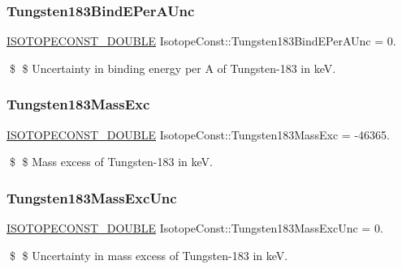 \subsubsection{\texorpdfstring{Tungsten183\+Bind\+E\+Per\+A\+Unc}{Tungsten183BindEPerAUnc}}
{\footnotesize\ttfamily \mbox{\hyperlink{group___isotope_const-_macros_ga8f45a7272ce02c0b4c65c44636ed719a}{I\+S\+O\+T\+O\+P\+E\+C\+O\+N\+S\+T\+\_\+\+D\+O\+U\+B\+LE}} Isotope\+Const\+::\+Tungsten183\+Bind\+E\+Per\+A\+Unc = 0.}

\$ \$ Uncertainty in binding energy per A of Tungsten-\/183 in keV. \mbox{\label{group___isotope_const-_tungsten-_w183_gacbff8d9805cc71177333bfcd1dae6556}} 
\subsubsection{\texorpdfstring{Tungsten183\+Mass\+Exc}{Tungsten183MassExc}}
{\footnotesize\ttfamily \mbox{\hyperlink{group___isotope_const-_macros_ga8f45a7272ce02c0b4c65c44636ed719a}{I\+S\+O\+T\+O\+P\+E\+C\+O\+N\+S\+T\+\_\+\+D\+O\+U\+B\+LE}} Isotope\+Const\+::\+Tungsten183\+Mass\+Exc = -\/46365.}

\$ \$ Mass excess of Tungsten-\/183 in keV. \mbox{\label{group___isotope_const-_tungsten-_w183_ga4361250690c725b0fd216a5b827bf4fc}} 
\subsubsection{\texorpdfstring{Tungsten183\+Mass\+Exc\+Unc}{Tungsten183MassExcUnc}}
{\footnotesize\ttfamily \mbox{\hyperlink{group___isotope_const-_macros_ga8f45a7272ce02c0b4c65c44636ed719a}{I\+S\+O\+T\+O\+P\+E\+C\+O\+N\+S\+T\+\_\+\+D\+O\+U\+B\+LE}} Isotope\+Const\+::\+Tungsten183\+Mass\+Exc\+Unc = 0.}

\$ \$ Uncertainty in mass excess of Tungsten-\/183 in keV. \mbox{\label{group___isotope_const-_tungsten-_w183_gae246ce1de62a2789f72f100178582037}} 
